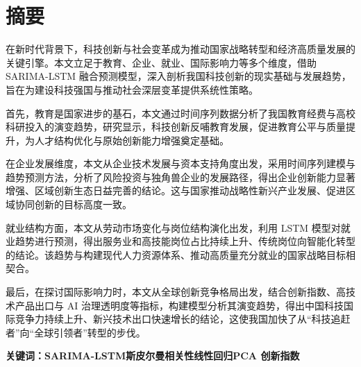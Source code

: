 \chapter*{摘要}
在新时代背景下，科技创新与社会变革成为推动国家战略转型和经济高质量发展的关键引擎。本文立足于教育、企业、就业、国际影响力等多个维度，借助 SARIMA-LSTM 融合预测模型，深入剖析我国科技创新的现实基础与发展趋势，旨在为建设科技强国与推动社会深层变革提供系统性策略。

首先，教育是国家进步的基石，本文通过时间序列数据分析了我国教育经费与高校科研投入的演变趋势，研究显示，科技创新反哺教育发展，促进教育公平与质量提升，为人才结构优化与原始创新能力增强奠定基础。

在企业发展维度，本文从企业技术发展与资本支持角度出发，采用时间序列建模与趋势预测方法，分析了风险投资与独角兽企业的发展路径，得出企业创新能力显著增强、区域创新生态日益完善的结论。这与国家推动战略性新兴产业发展、促进区域协同创新的目标高度一致。

就业结构方面，本文从劳动市场变化与岗位结构演化出发，利用 LSTM 模型对就业趋势进行预测，得出服务业和高技能岗位占比持续上升、传统岗位向智能化转型的结论。该趋势与构建现代人力资源体系、推动高质量充分就业的国家战略目标相契合。

最后，在探讨国际影响力时，本文从全球创新竞争格局出发，结合创新指数、高技术产品出口与 AI 治理透明度等指标，构建模型分析其演变趋势，得出中国科技国际竞争力持续上升、新兴技术出口快速增长的结论，这使我国加快了从“科技追赶者”向“全球引领者”转型的步伐。



\textbf{关键词：SARIMA-LSTM\hspace{0.5cm}斯皮尔曼相关性\hspace{0.5cm}线性回归\hspace{0.5cm}PCA
\hspace{0.5cm}创新指数 } 